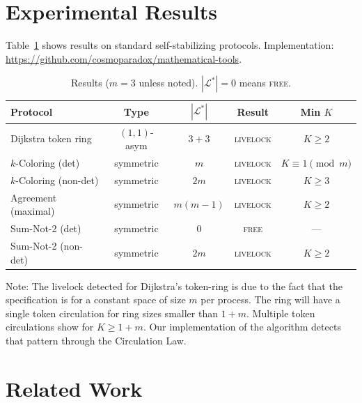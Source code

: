 \documentclass{article}
\newcommand{\Ls}{\mathcal{L}^{*}}
\begin{document}
\section{Experimental Results}

Table~\ref{tab:results} shows results on standard self-stabilizing
protocols. Implementation:
\url{https://github.com/cosmoparadox/mathematical-tools}.

\begin{table}[h]
\centering
\caption{Results ($m=3$ unless noted). $|\Ls|=0$ means \textsc{free}.}
\label{tab:results}
\smallskip
\begin{tabular}{lcccc}
\toprule
Protocol & Type & $|\Ls|$ & Result & Min $K$ \\
\midrule
Dijkstra token ring    & $(1,1)$-asym & $3{+}3$  & \textsc{livelock} & $K\!\geq\!2$\\
$k$-Coloring (det)     & symmetric    & $m$      & \textsc{livelock} & $K\!\equiv\!1\pmod{m}$\\
$k$-Coloring (non-det) & symmetric    & $2m$     & \textsc{livelock} & $K\!\geq\!3$\\
Agreement (maximal)    & symmetric    & $m(m{-}1)$ & \textsc{livelock} & $K\!\geq\!2$\\
Sum-Not-2 (det)        & symmetric    & $0$      & \textsc{free}     & ---\\
Sum-Not-2 (non-det)    & symmetric    & $2m$     & \textsc{livelock} & $K\!\geq\!2$\\
\bottomrule
\end{tabular}
\end{table}

Note: The livelock detected for Dijkstra's token-ring is due to the fact that the specification is for a constant space of size $m$ per process. The ring will have a single token circulation for ring sizes smaller than $1 + m$. Multiple token circulations show for $K \geq 1 + m$. Our implementation of the algorithm detects that pattern through the Circulation Law.
\section{Related Work}
\end{document}
